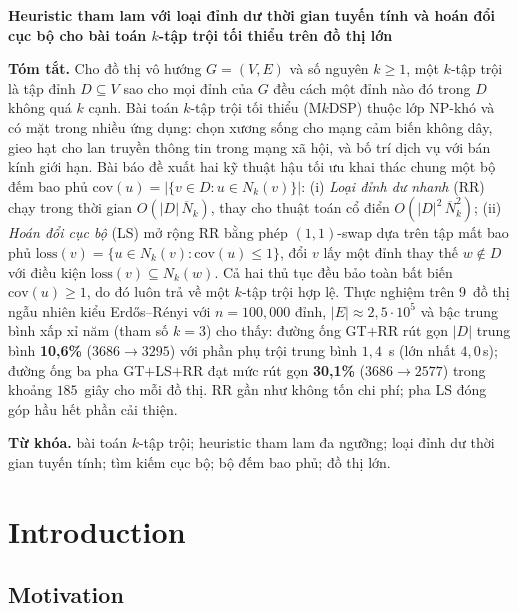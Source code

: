 \documentclass[11pt,a4paper]{article}
\newcommand{\Nk}{\overline{N}_k}
\newcommand{\cov}{\mathrm{cov}}
\newcommand{\loss}{\mathrm{loss}}
\begin{document}
\begin{center}
\textbf{Heuristic tham lam với loại đỉnh dư thời gian tuyến tính
và hoán đổi cục bộ cho bài toán $k$-tập trội tối thiểu trên đồ thị
lớn}
\end{center}

\noindent\textbf{Tóm tắt.}
Cho đồ thị vô hướng $G=(V,E)$ và số nguyên $k\ge 1$, một $k$-tập
trội là tập đỉnh $D\subseteq V$ sao cho mọi đỉnh của $G$ đều cách
một đỉnh nào đó trong $D$ không quá $k$ cạnh. Bài toán
$k$-tập trội tối thiểu (M$k$DSP) thuộc lớp NP-khó và có mặt trong
nhiều ứng dụng: chọn xương sống cho mạng cảm biến không dây, gieo
hạt cho lan truyền thông tin trong mạng xã hội, và bố trí dịch vụ
với bán kính giới hạn. Bài báo đề xuất hai kỹ thuật hậu tối ưu
khai thác chung một bộ đếm bao phủ $\cov(u)=|\{v\in D:u\in N_k(v)\}|$:
(i) \emph{Loại đỉnh dư nhanh} (RR) chạy trong thời gian
$O(|D|\,\Nk)$, thay cho thuật toán cổ điển $O(|D|^2\,\Nk^2)$;
(ii) \emph{Hoán đổi cục bộ} (LS) mở rộng RR bằng phép $(1,1)$-swap
dựa trên tập mất bao phủ
$\loss(v)=\{u\in N_k(v):\cov(u)\le 1\}$, đổi $v$ lấy một đỉnh thay
thế $w\notin D$ với điều kiện $\loss(v)\subseteq N_k(w)$. Cả hai
thủ tục đều bảo toàn bất biến $\cov(u)\ge 1$, do đó luôn trả về
một $k$-tập trội hợp lệ.
Thực nghiệm trên 9~đồ thị ngẫu nhiên kiểu Erd\H{o}s--R\'enyi với
$n=100{,}000$ đỉnh, $|E|\approx 2{,}5\cdot 10^5$ và bậc trung bình
xấp xỉ năm (tham số $k=3$) cho thấy: đường ống GT$+$RR rút gọn
$|D|$ trung bình \textbf{10{,}6\%} ($3686\to 3295$) với phần phụ
trội trung bình $1{,}4$~s (lớn nhất $4{,}0$\,s); đường ống ba pha
GT$+$LS$+$RR đạt mức rút gọn \textbf{30{,}1\%}
($3686\to 2577$) trong khoảng $185$~giây cho mỗi đồ thị. RR gần
như không tốn chi phí; pha LS đóng góp hầu hết phần cải thiện.

\medskip\noindent
\textbf{Từ khóa.} bài toán $k$-tập trội; heuristic tham lam đa
ngưỡng; loại đỉnh dư thời gian tuyến tính; tìm kiếm cục bộ; bộ đếm
bao phủ; đồ thị lớn.

\section{Introduction}
\label{sec:intro}

\subsection{Motivation}
\end{document}
